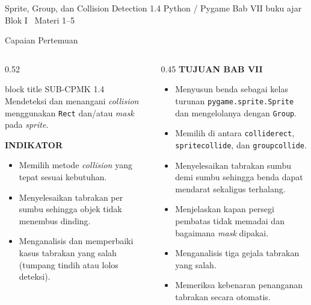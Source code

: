 \documentclass[aspectratio=169,10pt]{beamer}
\begin{document}
  {Sprite, Group, dan Collision Detection}
  {1.4}
  {Python / Pygame}
  {Bab VII buku ajar}
  {Blok I \textperiodcentered\ Materi 1--5}

\begin{frame}{Capaian Pertemuan}
\begin{columns}[T,onlytextwidth]
  \begin{column}{0.52\textwidth}
    \begin{beamercolorbox}[wd=\linewidth,sep=5pt,rounded=true]{block title}
      {\fontsize{6.8}{8}\selectfont\color{ubHead}SUB-CPMK 1.4}\\[2pt]
      {\footnotesize Mendeteksi dan menangani \emph{collision} menggunakan
       \texttt{Rect} dan/atau \emph{mask} pada \emph{sprite}.}
    \end{beamercolorbox}
    \vspace{0.16cm}

    {\fontsize{7}{8.5}\selectfont\bfseries\color{ubAccent}INDIKATOR}\par
    \vspace{0.06cm}
    \begin{itemize}
      \item Memilih metode \emph{collision} yang tepat sesuai kebutuhan.
      \item Menyelesaikan tabrakan per sumbu sehingga objek tidak menembus
            dinding.
      \item Menganalisis dan memperbaiki kasus tabrakan yang salah
            (tumpang tindih atau lolos deteksi).
    \end{itemize}
  \end{column}
  \begin{column}{0.45\textwidth}
    {\fontsize{7}{8.5}\selectfont\bfseries\color{ubAccent}TUJUAN BAB VII}\par
    \vspace{0.08cm}
    \begin{itemize}
      \item Menyusun benda sebagai kelas turunan
            \texttt{pygame.sprite.Sprite} dan mengelolanya dengan
            \texttt{Group}.
      \item Memilih di antara \texttt{colliderect}, \texttt{spritecollide},
            dan \texttt{groupcollide}.
      \item Menyelesaikan tabrakan sumbu demi sumbu sehingga benda dapat
            mendarat sekaligus terhalang.
      \item Menjelaskan kapan persegi pembatas tidak memadai dan bagaimana
            \emph{mask} dipakai.
      \item Menganalisis tiga gejala tabrakan yang salah.
      \item Memeriksa kebenaran penanganan tabrakan secara otomatis.
    \end{itemize}
  \end{column}
\end{columns}
\end{frame}
\end{document}
